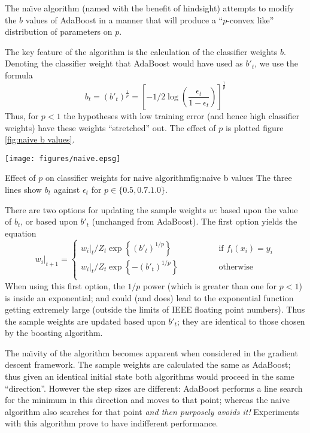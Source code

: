 The na\"{\i}ve algorithm (named with the benefit of hindsight) attempts to
modify the $b$ values of AdaBoost in a manner that will produce a
``$p$-convex like'' distribution of parameters on $p$.

The key feature of the algorithm is the calculation of the classifier
weights $b$.  Denoting the classifier weight that AdaBoost would have
used as $b'_t$, we use the formula
%
\begin{equation}
b_t = (b'_t)^{\frac{1}{p}} = \left[ - 1/2 \log \left( \frac{\epsilon_t}{1
- \epsilon_t} \right) \right]^\frac{1}{p}
\end{equation}
%
Thus, for $p < 1$ the hypotheses with low training error (and hence
high classifier weights) have these weights ``stretched'' out.  The
effect of $p$ is plotted figure \ref{fig:naive b values}.

\begin{linefigure}
\begin{center}
\texttt{[image: figures/naive.epsg]}
\end{center}
\begin{capt}{Effect of $p$ on classifier weights for naive algorithm}{fig:naive b values}
The three lines show $b_t$ against $\epsilon_t$ for $p \in \{ 0.5,
0.7. 1.0 \}$.
\end{capt}
\end{linefigure}

There are two options for updating the sample weights $w$: based upon
the value of $b_t$, or based upon $b'_t$ (unchanged from AdaBoost).
The first option yields the equation
%
\begin{equation}
w_i|_{t+1} = \left\{
\begin{array}{cl}
	w_i|_t / Z_t \exp \left\{ (b'_t)^{1/p} \right\} & \qquad \qquad \mbox{if
	$f_t(x_i) = y_i$} \\
	w_i|_t / Z_t \exp \left\{ -(b'_t)^{1/p} \right\} 	& \qquad \qquad
	\mbox{otherwise} \\
\end{array} \right.
\end{equation}
%
When using this first option, the $1/p$ power (which is
greater than one for $p < 1$) is inside an exponential; and could
(and does) lead to the exponential function getting extremely large
(outside the limits of IEEE floating point numbers).  Thus the sample
weights are updated based upon $b'_t$; they are identical to those
chosen by the boosting algorithm.

The na\"{\i}vity of the algorithm becomes apparent when considered in
the gradient descent framework.  The sample weights are calculated
the same as AdaBoost; thus given an identical initial state both
algorithms would proceed in the same ``direction''.  However the step
sizes are different: AdaBoost performs a line search for the minimum
in this direction and moves to that point; whereas the naive algorithm
also searches for that point \emph{and then purposely avoids it!}
Experiments with this algorithm prove to have indifferent performance.

